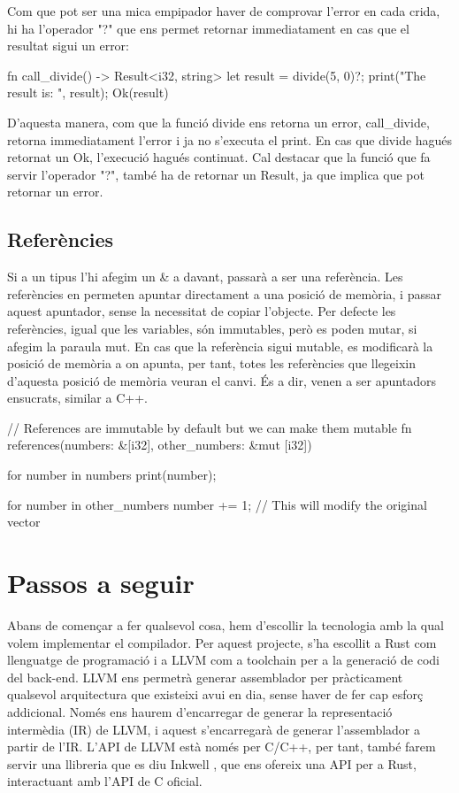 ﻿\documentclass{article}
\begin{document}
Com que pot ser una mica empipador haver de comprovar l'error en cada crida, hi
ha l'operador "?" que ens permet retornar immediatament en cas que el resultat
sigui un error:

\begin{code}
fn call_divide() -> Result<i32, string> {
    let result = divide(5, 0)?;
    print("The result is: ", result);
    Ok(result)
}
\end{code}

D'aquesta manera, com que la funció divide ens retorna un error, call\_divide,
retorna immediatament l'error i ja no s'executa el print. En cas que divide hagués
retornat un Ok, l'execució hagués continuat. Cal destacar que la funció que 
fa servir l'operador "?", també ha de retornar un Result, ja que implica que pot
retornar un error.

\subsection{Referències}

Si a un tipus l'hi afegim un {\ttfamily \&} a davant, passarà a ser una referència. Les
referències en permeten apuntar directament a una posició de memòria, i passar
aquest apuntador, sense la necessitat de copiar l'objecte. Per defecte les
referències, igual que les variables, són immutables, però es poden mutar, si
afegim la paraula mut. En cas que la referència sigui mutable, es modificarà
la posició de memòria a on apunta, per tant, totes les referències que llegeixin
d'aquesta posició de memòria veuran el canvi. És a dir, venen a ser apuntadors
ensucrats, similar a C++.

\begin{code}
// References are immutable by default but we can make them mutable
fn references(numbers: &[i32], other_numbers: &mut [i32]) {
    for number in numbers {
        print(number);
    }

    for number in other_numbers {
        number += 1; // This will modify the original vector
    }
}
\end{code}

\section{Passos a seguir}

Abans de començar a fer qualsevol cosa, hem d'escollir la tecnologia amb la qual
volem implementar el compilador. Per aquest projecte, s'ha escollit a Rust com
llenguatge de programació i a LLVM \cite{llvm_website} com a toolchain per a la generació de codi
del back-end. LLVM ens permetrà generar assemblador per pràcticament qualsevol
arquitectura que existeixi avui en dia, sense haver de fer cap esforç addicional.
Només ens haurem d'encarregar de generar la representació intermèdia (IR) de LLVM,
i aquest s'encarregarà de generar l'assemblador a partir de l'IR. L'API de LLVM 
està només per C/C++, per tant, també farem servir una llibreria que es diu 
Inkwell \cite{inkwell}, que ens ofereix una API per a Rust, interactuant amb 
l'API de C oficial.
\end{document}
